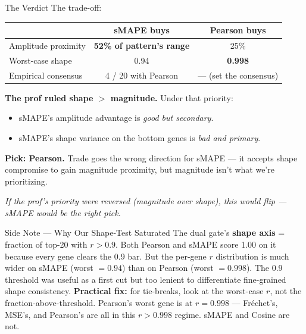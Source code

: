 \documentclass[aspectratio=169,12pt,handout]{beamer}
\begin{document}
\begin{frame}{The Verdict}
\small
The trade-off:
\begin{center}
\begin{tabular}{lcc}
\toprule
& \textbf{sMAPE buys} & \textbf{Pearson buys} \\
\midrule
Amplitude proximity & \textbf{52\% of pattern's range} & 25\% \\
Worst-case shape    & 0.94 & \textbf{0.998} \\
Empirical consensus & 4 / 20 with Pearson & --- (set the consensus) \\
\bottomrule
\end{tabular}
\end{center}

\vspace{0.6em}
\textbf{The prof ruled shape $>$ magnitude.} Under that priority:
\begin{itemize}\itemsep0pt
  \item sMAPE's amplitude advantage is \textit{good but secondary}.
  \item sMAPE's shape variance on the bottom genes is \textit{bad and primary}.
\end{itemize}

\vspace{0.6em}
\textcolor{binggreen}{\textbf{Pick: Pearson.}} Trade goes the wrong direction for sMAPE --- it accepts shape compromise to gain magnitude proximity, but magnitude isn't what we're prioritizing.

\vspace{0.4em}
\small \textit{If the prof's priority were reversed (magnitude over shape), this would flip --- sMAPE would be the right pick.}
\end{frame}

\begin{frame}{Side Note --- Why Our Shape-Test Saturated}
\small
The dual gate's \textbf{shape axis} = fraction of top-20 with $r > 0.9$. Both Pearson and sMAPE score 1.00 on it because every gene clears the 0.9 bar.
\vspace{0.4em}
But the per-gene $r$ distribution is much wider on sMAPE (worst $= 0.94$) than on Pearson (worst $= 0.998$). The 0.9 threshold was useful as a first cut but too lenient to differentiate fine-grained shape consistency.
\vspace{0.4em}
\textcolor{binggreen}{\textbf{Practical fix:}} for tie-breaks, look at the worst-case $r$, not the fraction-above-threshold. Pearson's worst gene is at $r = 0.998$ --- Fr\'{e}chet's, MSE's, and Pearson's are all in this $r > 0.998$ regime. sMAPE and Cosine are not.
\end{frame}
\end{document}
